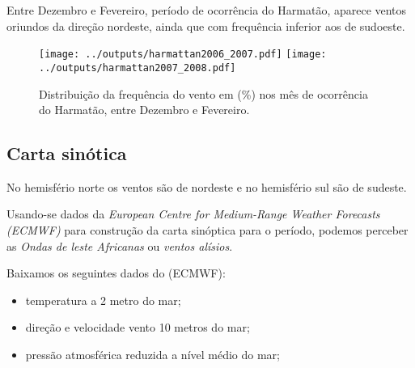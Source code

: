 Entre Dezembro e Fevereiro, período de ocorrência do Harmatão, aparece 
ventos oriundos da direção nordeste, ainda que com frequência inferior 
aos de sudoeste.

\begin{figure}[H]
\begin{center}
  \texttt{[image: ../outputs/harmattan2006\_2007.pdf]}
  \texttt{[image: ../outputs/harmattan2007\_2008.pdf]}
\end{center}
\caption{Distribuição da frequência do vento em (\%) nos mês de ocorrência
         do Harmatão, entre Dezembro e Fevereiro.}
\end{figure}

\subsection{Carta sinótica}


No hemisfério norte os ventos são de nordeste e no hemisfério sul são de sudeste. 


Usando-se dados da \textit{European Centre for Medium-Range Weather Forecasts (ECMWF)}
para construção da carta sinóptica para o período, podemos perceber as 
\textit{Ondas de leste Africanas} ou \textit{ventos alísios}.

Baixamos os seguintes dados do (ECMWF):
\begin{itemize}
  \item temperatura a 2 metro do mar;
  \item direção e velocidade vento 10 metros do mar;
  \item pressão atmosférica reduzida a nível médio do mar;
\end{itemize}


